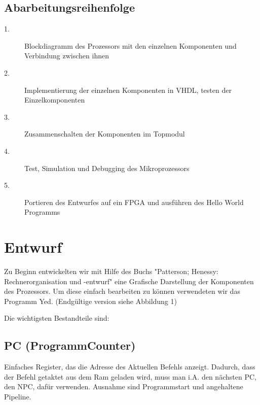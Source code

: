 \documentclass[11pt]{article} %
\begin{document}
\vspace{2cm}

\subsection{Abarbeitungsreihenfolge}
\begin{description}
\item[1.] Blockdiagramm des Prozessors mit den einzelnen Komponenten und Verbindung zwischen ihnen

\item[2.] Implementierung der einzelnen Komponenten in VHDL, testen der Einzelkomponenten

\item[3.] Zusammenschalten der Komponenten im Topmodul

\item[4.] Test, Simulation und Debugging des Mikroprozessors

\item[5.] Portieren des Entwurfes auf ein FPGA und ausführen des Hello World Programms
\end{description}


\newpage


\section{Entwurf}

Zu Beginn entwickelten wir mit Hilfe des Buchs "Patterson; Henessy: 
Rechnerorganisation und -entwurf" eine Grafische Darstellung der Komponenten des Prozessors. Um diese einfach bearbeiten zu können verwendeten wir das Programm Yed. (Endgültige version siehe Abbildung 1)
\vspace*{1cm}

{\Large Die wichtigsten Bestandteile sind:}\\


\subsection{PC (ProgrammCounter)}
Einfaches Register, das die Adresse des Aktuellen Befehls anzeigt. Dadurch, dass der Befehl getaktet aus dem Ram geladen wird, muss man i.A. den nächsten PC, den NPC, dafür verwenden. Ausnahme sind Programmstart und angehaltene Pipeline.
\end{document}
